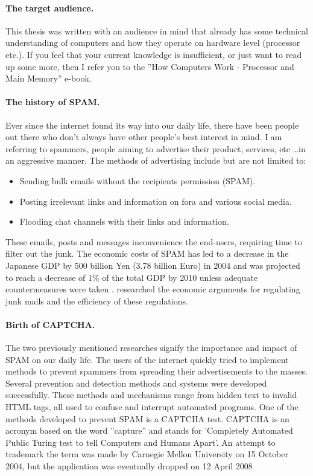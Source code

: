 \documentclass[pdftex,a4paper,12pt,twoside]{report}
\theoremstyle{plain} \newtheorem{theorem}{Theorem} \newtheorem{proposition}{Proposition} \newtheorem{lemma}{Lemma} \newtheorem*{corollary}{Corollary}
\theoremstyle{definition} \newtheorem{definition}{Definition} \newtheorem{conjecture}{Conjecture} \newtheorem*{example}{Example} \newtheorem{algorithm}{Algorithm}
\theoremstyle{remark} \newtheorem*{remark}{Remark} \newtheorem*{note}{Note} \newtheorem{case}{Case}
\begin{document}
\paragraph{The target audience.}
This thesis was written with an audience in mind that already has some technical understanding of computers and how they operate on hardware level (processor etc.). If you feel that your current knowledge is insufficient, or just want to read up some more, then I refer you to the ''How Computers Work - Processor and Main Memory'' \citep{Young2001} e-book.
\paragraph{The history of SPAM.} 
Ever since the internet found its way into our daily life, there have been people out there who don't always have other people's best interest in mind. I am referring to spammers, people aiming to advertise their product, services, etc \ldots in an aggressive manner. The methods of advertising include but are not limited to: \begin{itemize}
\item Sending bulk emails without the recipients permission (SPAM). 
\item Posting irrelevant links and information on fora and various social media.
\item Flooding chat channels with their links and information. 
\end{itemize}
These emails, posts and messages inconvenience the end-users, requiring time to filter out the junk. The economic costs of SPAM has led to a decrease in the Japanese GDP by 500 billion Yen (3.78 billion Euro) in 2004 and was projected to reach a decrease of 1\% of the total GDP by 2010 unless adequate countermeasures were taken \citep{Ukai2007}. \citep{Khong2004} researched the economic arguments for regulating junk mails and the efficiency of these regulations.
\paragraph{Birth of CAPTCHA.} 
The two previously mentioned researches signify the importance and impact of SPAM on our daily life. The users of the internet quickly tried to implement methods to prevent spammers from spreading their advertisements to the masses. Several prevention and detection methods and systems were developed successfully. These methods and mechanisms range from hidden text to invalid HTML tags, all used to confuse and interrupt automated programs. One of the methods developed to prevent SPAM is a CAPTCHA test. CAPTCHA is an acronym based on the word ''capture'' and stands for 'Completely Automated Public Turing test to tell Computers and Humans Apart'. An attempt to trademark  the term was made by Carnegie Mellon University on 15 October 2004, but the application was eventually dropped on 12 April 2008
\end{document}
